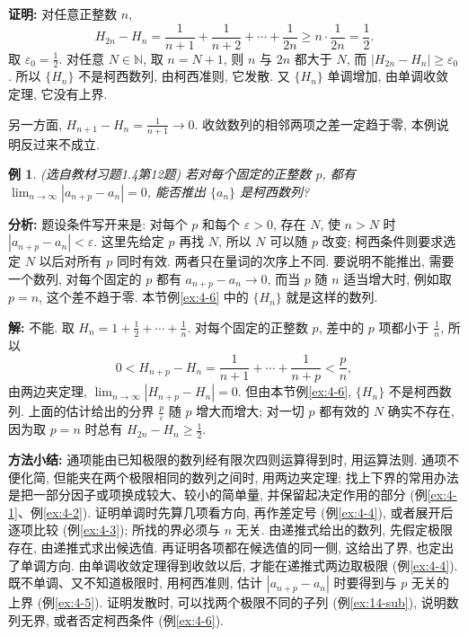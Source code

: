 \documentclass[UTF8,openany]{ctexbook}
\theoremstyle{chinesetextbook}
\newtheorem{example}{例}[section]
\newenvironment{cnproof}{\par\indent\textbf{证明:} \ignorespaces}{\par}
\newenvironment{cnsolution}{\par\indent\textbf{解:} \ignorespaces}{\par}
\begin{document}
\begin{cnproof}
对任意正整数 $n$,
\[
H_{2n}-H_n=\frac1{n+1}+\frac1{n+2}+\cdots+\frac1{2n}\ge n\cdot\frac1{2n}=\frac12.
\]
取 $\displaystyle\varepsilon_0=\frac12$. 对任意 $N\in\mathbb N$, 取 $n=N+1$, 则 $n$ 与 $2n$ 都大于 $N$, 而 $|H_{2n}-H_n|\ge\varepsilon_0$. 所以 $\{H_n\}$ 不是柯西数列, 由柯西准则, 它发散. 又 $\{H_n\}$ 单调增加, 由单调收敛定理, 它没有上界.

另一方面, $\displaystyle H_{n+1}-H_n=\frac1{n+1}\to0$. 收敛数列的相邻两项之差一定趋于零, 本例说明反过来不成立.
\end{cnproof}
\begin{example}
\textnormal{(选自教材习题1.4第12题)} 若对每个固定的正整数 $p$, 都有 $\displaystyle\lim_{n\to\infty}|a_{n+p}-a_n|=0$, 能否推出 $\{a_n\}$ 是柯西数列?
\end{example}
\par\indent\textbf{分析:} 题设条件写开来是: 对每个 $p$ 和每个 $\varepsilon>0$, 存在 $N$, 使 $n>N$ 时 $|a_{n+p}-a_n|<\varepsilon$. 这里先给定 $p$ 再找 $N$, 所以 $N$ 可以随 $p$ 改变; 柯西条件则要求选定 $N$ 以后对所有 $p$ 同时有效. 两者只在量词的次序上不同. 要说明不能推出, 需要一个数列, 对每个固定的 $p$ 都有 $a_{n+p}-a_n\to0$, 而当 $p$ 随 $n$ 适当增大时, 例如取 $p=n$, 这个差不趋于零. 本节例\ref{ex:4-6} 中的 $\{H_n\}$ 就是这样的数列.
\begin{cnsolution}
不能. 取 $\displaystyle H_n=1+\frac12+\cdots+\frac1n$. 对每个固定的正整数 $p$, 差中的 $p$ 项都小于 $\displaystyle\frac1n$, 所以
\[
0<H_{n+p}-H_n=\frac1{n+1}+\cdots+\frac1{n+p}<\frac pn,
\]
由两边夹定理, $\displaystyle\lim_{n\to\infty}|H_{n+p}-H_n|=0$. 但由本节例\ref{ex:4-6}, $\{H_n\}$ 不是柯西数列. 上面的估计给出的分界 $\displaystyle\frac p\varepsilon$ 随 $p$ 增大而增大; 对一切 $p$ 都有效的 $N$ 确实不存在, 因为取 $p=n$ 时总有 $\displaystyle H_{2n}-H_n\ge\frac12$.
\end{cnsolution}
\par\indent\textbf{方法小结:} 通项能由已知极限的数列经有限次四则运算得到时, 用运算法则. 通项不便化简, 但能夹在两个极限相同的数列之间时, 用两边夹定理; 找上下界的常用办法是把一部分因子或项换成较大、较小的简单量, 并保留起决定作用的部分 (例\ref{ex:4-1}、例\ref{ex:4-2}). 证明单调时先算几项看方向, 再作差定号 (例\ref{ex:4-4}), 或者展开后逐项比较 (例\ref{ex:4-3}); 所找的界必须与 $n$ 无关. 由递推式给出的数列, 先假定极限存在, 由递推式求出候选值. 再证明各项都在候选值的同一侧, 这给出了界, 也定出了单调方向. 由单调收敛定理得到收敛以后, 才能在递推式两边取极限 (例\ref{ex:4-4}). 既不单调、又不知道极限时, 用柯西准则, 估计 $|a_{n+p}-a_n|$ 时要得到与 $p$ 无关的上界 (例\ref{ex:4-5}). 证明发散时, 可以找两个极限不同的子列 (例\ref{ex:14-sub}), 说明数列无界, 或者否定柯西条件 (例\ref{ex:4-6}).
\end{document}

